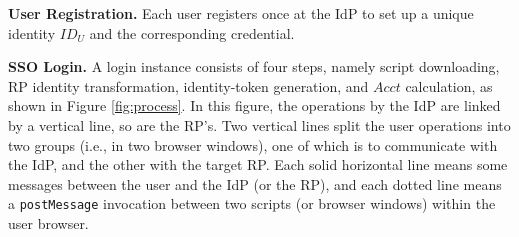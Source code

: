
\noindent\textbf{User Registration.}
Each user registers once at the IdP to set up a unique identity $ID_U$ and the corresponding credential.


\vspace{0.8mm}
\noindent\textbf{SSO Login.} A login instance %
consists of four steps, namely script downloading, RP identity transformation,
identity-token generation, and $Acct$ calculation, as shown in Figure \ref{fig:process}.
In this figure,
    the operations by the IdP are linked by a vertical line,
        so are the RP's.
Two vertical lines split the user operations into two groups (i.e., in two browser windows),
    one of which is to communicate with the IdP,
                 and the other with the target RP.
Each solid horizontal line means some messages between the user and the IdP (or the RP),
            and each dotted line means a \verb+postMessage+ invocation between two scripts (or browser windows) within the user browser.



